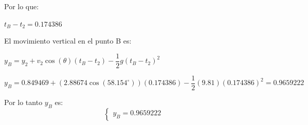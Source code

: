 \documentclass[a4paper,11pt]{scrartcl}
\begin{document}
\begin{center}
Por lo que:\\
\begin{center}
$t_{B} - t_{2} = 0.174386$\\
\end{center}

El movimiento vertical en el punto B es:\\
\begin{center}
$y_{B} = y_{2} + v_{2}\cos(\theta)(t_{B} - t_{2}) - \dfrac{1}{2}g(t_{B} - t_{2})^{2}$\\
\end{center}
\begin{center}
$y_{B} = 0.849469 + (2.88674\cos(58.154^{\circ}))(0.174386) - \dfrac{1}{2}(9.81)(0.174386)^{2} = 0.9659222 $\\
\end{center}

Por lo tanto $y_{B}$ es:
\begin{equation*}
  \left\lbrace
  \begin{array}{l}
   y_{B} =  0.9659222
  \end{array}
  \right.
\end{equation*}

\end{center}
\end{document}
